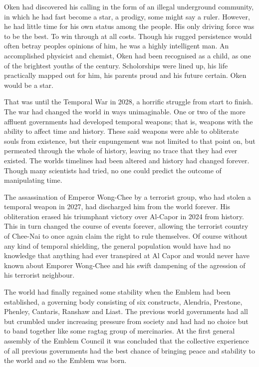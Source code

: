 Oken had discovered his calling in the form of an illegal underground community, in which he had fast become a star, a prodigy, some might say a ruler. However, he had little time for his own status among the people. His only driving force was to be the best. To win through at all costs. Though his rugged persistence would often betray peoples opinions of him, he was a highly intelligent man. An accomplished physicist and chemist, Oken had been recognised as a child, as one of the brightest youths of the century. Scholorships were lined up, his life practically mapped out for him, his parents proud and his future certain. Oken would be a star.

That was until the Temporal War in 2028, a horrific struggle from start to finish. The war had changed the world in ways unimaginable. One or two of the more affluent governments had developed temporal weapons; that is, weapons with the ability to affect time and history. These said weapons were able to obliterate souls from existence, but their enpungement was not limited to that point on, but permeated through the whole of history, leaving no trace that they had ever existed. The worlds timelines had been altered and history had changed forever. Though many scientists had tried, no one could predict the outcome of manipulating time.

The assassination of Emperor Wong-Chee by a terrorist group, who had stolen a temporal weapon in 2027, had discharged him from the world forever. His obliteration erased his triumphant victory over Al-Capor in 2024 from history. This in turn changed the course of events forever, allowing the terrorist country of Chee-Nai to once again claim the right to rule themselves. Of course without any kind of temporal shielding, the general population would have had no knowledge that anything had ever transpired at Al Capor and would never have known about Emporer Wong-Chee and his swift dampening of the agression of his terrorist neighbour.

The world had finally regained some stability when the Emblem had been established, a governing body consisting of six constructs, Alendria, Prestone, Phenley, Cantaris, Ranshaw and Liast. The previous world governments had all but crumbled under increasing pressure from society and had had no choice but to band together like some ragtag group of mercinaries. At the first general assembly of the Emblem Council it was concluded that the collective experience of all previous governments had the best chance of bringing peace and stability to the world and so the Emblem was born.

